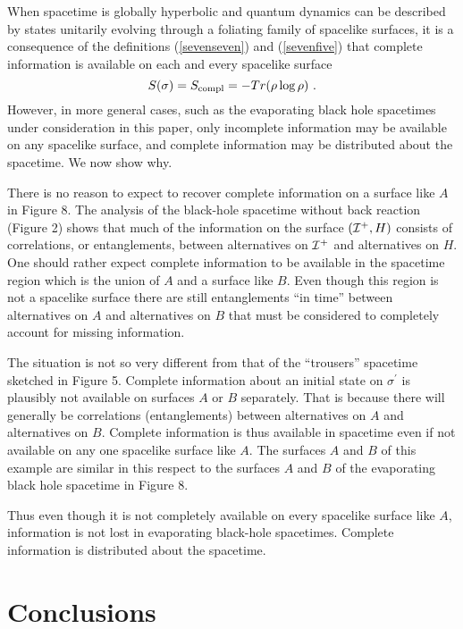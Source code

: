 When spacetime is globally hyperbolic and quantum dynamics can be
described by states unitarily evolving through a foliating family of
spacelike surfaces, it is a consequence of the definitions
(\ref{sevenseven}) and (\ref{sevenfive}) that complete information is
available on each and every spacelike surface
\begin{equation}
S(\sigma) = S_{\rm compl} = - Tr (\rho \log \rho)\ .
\label{seveneight}
\end{equation}
However, in more general cases, such as the evaporating black hole
spacetimes under consideration in this paper, only incomplete
information may be available on any spacelike surface, and complete
information may be distributed about the spacetime.  We now show why.


There is no reason to expect to recover complete information on
a surface like $A$ in Figure 8. The analysis of the black-hole spacetime without
back reaction (Figure 2) shows that much of the information on the
surface $({\cal I}^+, H)$ consists of correlations, or entanglements,
between alternatives on ${\cal I}^+$ and alternatives on $H$. One should
rather expect complete information to be available in the spacetime
region which is the union of $A$ and a surface like $B$. Even though
this region is not a spacelike surface there are still entanglements
``in time'' between alternatives on $A$ and alternatives on $B$ that
must be considered to completely account for missing information.

The situation is not so very different from that of the ``trousers''
spacetime sketched in Figure 5. Complete information about an initial
state on $\sigma^\prime$ is plausibly not available on surfaces $A$ or
$B$ separately. That is because there will generally be correlations
(entanglements) between alternatives on $A$ and alternatives on 
$B$. Complete information is thus
available in spacetime even if not available on any one spacelike
surface like $A$. The surfaces $A$ and $B$ 
of this example are similar in this respect
to the surfaces $A$ and $B$ of the evaporating black hole spacetime
in Figure 8.


Thus even
though it is not completely available on every spacelike surface like
$A$, information is not lost in evaporating black-hole spacetimes. 
Complete information is distributed about the spacetime. 

\section{Conclusions}


